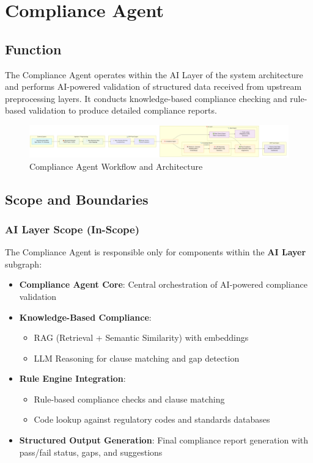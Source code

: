 \documentclass[12pt]{report}
\begin{document}
\chapter{Compliance Agent}
\section{Function}
The Compliance Agent operates within the AI Layer of the system architecture and performs AI-powered validation of structured data received from upstream preprocessing layers. It conducts knowledge-based compliance checking and rule-based validation to produce detailed compliance reports.

\begin{figure}[htbp]
\centering
\includegraphics[width=\textwidth,height=1.2\textheight,keepaspectratio]{../../pics/compliance.png}
\caption{Compliance Agent Workflow and Architecture}
\label{fig:compliance-workflow}
\end{figure}

\section{Scope and Boundaries}
\subsection{AI Layer Scope (In-Scope)}
The Compliance Agent is responsible only for components within the \textbf{AI Layer} subgraph:
\begin{itemize}
  \item \textbf{Compliance Agent Core}: Central orchestration of AI-powered compliance validation
  \item \textbf{Knowledge-Based Compliance}: 
    \begin{itemize}
      \item RAG (Retrieval + Semantic Similarity) with embeddings
      \item LLM Reasoning for clause matching and gap detection
    \end{itemize}
  \item \textbf{Rule Engine Integration}:
    \begin{itemize}
      \item Rule-based compliance checks and clause matching
      \item Code lookup against regulatory codes and standards databases
    \end{itemize}
  \item \textbf{Structured Output Generation}: Final compliance report generation with pass/fail status, gaps, and suggestions
\end{itemize}
\end{document}
